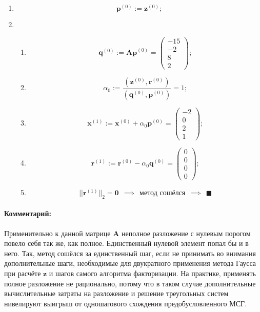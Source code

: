 \begin{enumerate}
    \item $$\mathbf{p}^{(0)} := \mathbf{z}^{(0)};$$

    \item \begin{enumerate}
        \item $$\mathbf{q}^{(0)} :=
        \mathbf{Ap}^{(0)} = \begin{pmatrix} -15\\ -2\\ 8\\ 2 \end{pmatrix};$$

        \item $$\alpha_0 :=
        \dfrac{(\mathbf{z}^{(0)}, \mathbf{r}^{(0)})}{(\mathbf{q}^{(0)}, \mathbf{p}^{(0)})} = 1;$$

        \item $$\mathbf{x}^{(1)} :=
        \mathbf{x}^{(0)}+\alpha_0\mathbf{p}^{(0)} = \begin{pmatrix} -2\\ 0\\ 2\\ 1 \end{pmatrix};$$

         \item $$\mathbf{r}^{(1)} :=
        \mathbf{r}^{(0)}-\alpha_0\mathbf{q}^{(0)} = \begin{pmatrix} 0\\ 0\\ 0 \\ 0 \end{pmatrix};$$

        \item $$||\mathbf{r}^{(1)}||_2 = \mathbf{0} ~~\implies ~~ \text{метод сошёлся} ~~\implies ~~ \blacksquare$$
    \end{enumerate}
\end{enumerate}

\paragraph{Комментарий:} Применительно к данной матрице $\mathbf{A}$ неполное разложение с нулевым порогом повело себя так же, как полное. Единственный нулевой элемент попал бы и в него. Так, метод сошёлся за единственный шаг, если не принимать во внимания дополнительные шаги, необходимые для двукратного применения метода Гаусса при расчёте $\mathbf{z}$ и шагов самого алгоритма факторизации. На практике, применять полное разложение не рационально, потому что в таком случае дополнительные вычислительные затраты на разложение и решение треугольных систем нивелируют выигрыш от одношагового схождения предобусловленного МСГ.

